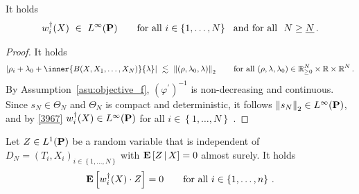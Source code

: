 \begin{lemma}
  \label{weights_l_inf}
  It holds 
  \begin{gather*}
    w_i^\dagger(X)
  \ 
  \in
  \ 
  L^\infty(\P)
  \qquad
  \text{for all}
  \ 
  i\in \left\{ 1,\ldots,N \right\}
  \ 
  \text{
    and
  for all 
  }\ 
  N\ge \underline{N}
  \,.
  \end{gather*}
\end{lemma}
\begin{proof}
  It holds
  \begin{gather}
    \label{3967}
    \left| 
     \rho_i 
     +
      \lambda_0
      +
      \inner{B(X,X_1,\ldots,X_N)}{\lambda}
    \right|
    \ 
    \lesssim
    \ 
    \norm{(\rho,\lambda_0,\lambda)}_2
    \qquad
    \text{for all}\ 
    (\rho,\lambda,\lambda_0)
    \in
  \R^N_{\ge 0}
  \times
  \R
  \times
  \R^{N}
    \,.
  \end{gather}
  By Assumption~\ref{asu:objective_f}, $(\varphi^{'})^{-1}$ is non-decreasing and continuous. 
  Since $s_N\in\Theta_N$ and $\Theta_N$ is compact and deterministic, it follows 
  $\norm{s_N}_2 \in L^\infty(\P)$, and
    by \eqref{3967} $w_i^\dagger(X) \in L^\infty (\P)$ for all $i\in \left\{
      1,\ldots,N
    \right\}$ .
\end{proof}
\begin{lemma}
  \label{w.Z=0}
  Let
  $Z\in L^1(\P)$
  be a random variable that is independent of $D_N=(T_i,X_i)_{i\in \left\{
    1,\ldots,N
  \right\}}$ 
  with
  $
\E
\left[
  Z
  \,
  |
  \, 
  X
\right]
= 0
  $
  almost surely.
  It holds
  \begin{gather*}
  \E
  \left[
    w_i^\dagger(X)
  \cdot Z
  \right]
  =0
  \qquad
  \text{for all}
  \ 
  i\in \left\{ 1,\ldots,n \right\}
  \,.
  \end{gather*}
\end{lemma}
